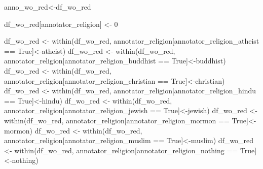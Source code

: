 \documentclass[
]{article}
\newenvironment{Shaded}{\begin{snugshade}}{\end{snugshade}}
\newcommand{\DecValTok}[1]{\textcolor[rgb]{0.00,0.00,0.81}{#1}}
\newcommand{\FunctionTok}[1]{\textcolor[rgb]{0.00,0.00,0.00}{#1}}
\newcommand{\NormalTok}[1]{#1}
\newcommand{\OtherTok}[1]{\textcolor[rgb]{0.56,0.35,0.01}{#1}}
\newcommand{\SpecialCharTok}[1]{\textcolor[rgb]{0.00,0.00,0.00}{#1}}
\newcommand{\StringTok}[1]{\textcolor[rgb]{0.31,0.60,0.02}{#1}}
\begin{document}
\begin{Shaded}
\begin{Highlighting}[]
\NormalTok{anno\_wo\_red}\OtherTok{\textless{}{-}}\NormalTok{df\_wo\_red}


\NormalTok{df\_wo\_red[}\StringTok{\textquotesingle{}annotator\_religion\textquotesingle{}}\NormalTok{] }\OtherTok{\textless{}{-}} \DecValTok{0}
                       
\NormalTok{df\_wo\_red }\OtherTok{\textless{}{-}} \FunctionTok{within}\NormalTok{(df\_wo\_red, annotator\_religion[annotator\_religion\_atheist }\SpecialCharTok{==} \StringTok{\textquotesingle{}True\textquotesingle{}}\NormalTok{]}\OtherTok{\textless{}{-}}\StringTok{\textquotesingle{}atheist\textquotesingle{}}\NormalTok{)}
\NormalTok{df\_wo\_red }\OtherTok{\textless{}{-}} \FunctionTok{within}\NormalTok{(df\_wo\_red, annotator\_religion[annotator\_religion\_buddhist }\SpecialCharTok{==} \StringTok{\textquotesingle{}True\textquotesingle{}}\NormalTok{]}\OtherTok{\textless{}{-}}\StringTok{\textquotesingle{}buddhist\textquotesingle{}}\NormalTok{)}
\NormalTok{df\_wo\_red }\OtherTok{\textless{}{-}} \FunctionTok{within}\NormalTok{(df\_wo\_red, annotator\_religion[annotator\_religion\_christian }\SpecialCharTok{==} \StringTok{\textquotesingle{}True\textquotesingle{}}\NormalTok{]}\OtherTok{\textless{}{-}}\StringTok{\textquotesingle{}christian\textquotesingle{}}\NormalTok{)}
\NormalTok{df\_wo\_red }\OtherTok{\textless{}{-}} \FunctionTok{within}\NormalTok{(df\_wo\_red, annotator\_religion[annotator\_religion\_hindu }\SpecialCharTok{==} \StringTok{\textquotesingle{}True\textquotesingle{}}\NormalTok{]}\OtherTok{\textless{}{-}}\StringTok{\textquotesingle{}hindu\textquotesingle{}}\NormalTok{)}
\NormalTok{df\_wo\_red }\OtherTok{\textless{}{-}} \FunctionTok{within}\NormalTok{(df\_wo\_red, annotator\_religion[annotator\_religion\_jewish }\SpecialCharTok{==} \StringTok{\textquotesingle{}True\textquotesingle{}}\NormalTok{]}\OtherTok{\textless{}{-}}\StringTok{\textquotesingle{}jewish\textquotesingle{}}\NormalTok{)}
\NormalTok{df\_wo\_red }\OtherTok{\textless{}{-}} \FunctionTok{within}\NormalTok{(df\_wo\_red, annotator\_religion[annotator\_religion\_mormon }\SpecialCharTok{==} \StringTok{\textquotesingle{}True\textquotesingle{}}\NormalTok{]}\OtherTok{\textless{}{-}}\StringTok{\textquotesingle{}mormon\textquotesingle{}}\NormalTok{)}
\NormalTok{df\_wo\_red }\OtherTok{\textless{}{-}} \FunctionTok{within}\NormalTok{(df\_wo\_red, annotator\_religion[annotator\_religion\_muslim }\SpecialCharTok{==} \StringTok{\textquotesingle{}True\textquotesingle{}}\NormalTok{]}\OtherTok{\textless{}{-}}\StringTok{\textquotesingle{}muslim\textquotesingle{}}\NormalTok{)}
\NormalTok{df\_wo\_red }\OtherTok{\textless{}{-}} \FunctionTok{within}\NormalTok{(df\_wo\_red, annotator\_religion[annotator\_religion\_nothing }\SpecialCharTok{==} \StringTok{\textquotesingle{}True\textquotesingle{}}\NormalTok{]}\OtherTok{\textless{}{-}}\StringTok{\textquotesingle{}nothing\textquotesingle{}}\NormalTok{)}

\end{Highlighting}
\end{Shaded}
\end{document}
